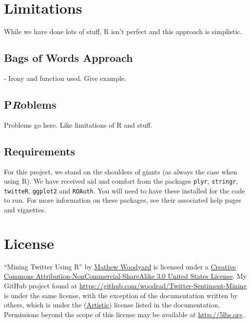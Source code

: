 \documentclass[letterpaper, 12pt]{article}
\begin{document}
\section{Limitations}
While we have done lots of stuff, R isn't perfect and this approach is simplistic.

\subsection{Bags of Words Approach}
- Irony and function used. Give example.

\subsection{P\emph{R}oblems}
Problems go here. Like limitations of R and stuff.

\subsection{Requirements}
For thie project, we stand on the shoulders of giants (as always the case when using R). We have received aid and comfort from the packages \verb+plyr+, \verb+stringr+, \verb+twitteR+, \verb+ggplot2+ and \verb+ROAuth+. You will need to have these installed for the code to run. For more information on these packages, see their associated help pages and vignettes.

\section{License}
``Mining Twitter Using R'' by \href{http://5lbs.org}{Mathew Woodyard} is licensed under a \href{http://creativecommons.org/licenses/by-nc-sa/3.0/us/}{Creative Commons Attribution-NonCommercial-ShareAlike 3.0 United States License}. My GitHub project found at \url{https://github.com/woodrad/Twitter-Sentiment-Mining} is under the same license, with the exception of the documentation written by others, which is under the (\href{https://en.wikipedia.org/wiki/Artistic_License}{Artistic}) license listed in the documentation. Permissions beyond the scope of this license may be available at \url{http://5lbs.org}.
\end{document}
